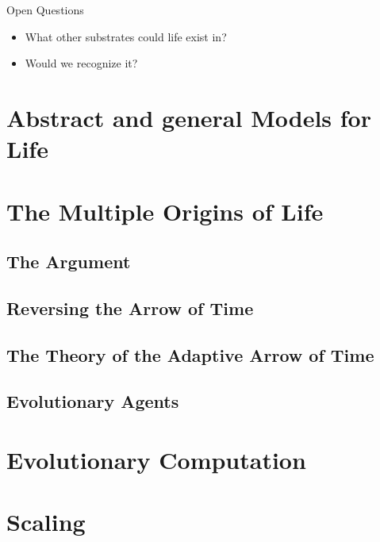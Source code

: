 \documentclass[]{article}
\begin{document}
Open Questions

\begin{itemize}
	\item What other substrates could life exist in?
	\item Would we recognize it?
\end{itemize}



\section{Abstract and general Models for Life}

\cite{trifonov2011vocabulary}

\cite{cronin2016beyond}

\section{The Multiple Origins of Life}

\subsection{The Argument}

\subsection{Reversing the Arrow of Time}

\subsection{The Theory of the Adaptive Arrow of Time}

\cite{rockmore2018cultural}

\subsection{Evolutionary Agents}

\section{Evolutionary Computation}

\cite{mitchell1998introduction}
\cite{eiben2003introduction}
\cite{holland1992adaptation}
\cite{forrest1993genetic}
\cite{ma2014novo}
\cite{marshall2014evolution}


\section{Scaling}
\end{document}
